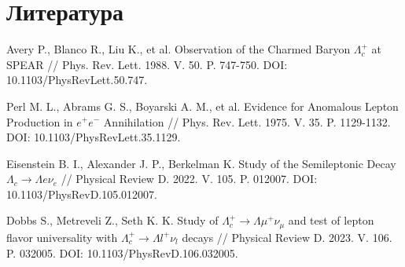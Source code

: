 \section{Литература}

\begin{thebibliography}{99}

    Avery P., Blanco R., Liu K., et al. Observation of the Charmed Baryon $\Lambda^+_c$ at SPEAR // Phys. Rev. Lett. 1988. V. 50. P. 747-750. DOI: 10.1103/PhysRevLett.50.747.
    
    Perl M. L., Abrams G. S., Boyarski A. M., et al. Evidence for Anomalous Lepton Production in $e^+e^-$ Annihilation // Phys. Rev. Lett. 1975. V. 35. P. 1129-1132. DOI: 10.1103/PhysRevLett.35.1129.
    
    Eisenstein B. I., Alexander J. P., Berkelman K. Study of the Semileptonic Decay $\Lambda_c \rightarrow \Lambda e \nu_e$ // Physical Review D. 2022. V. 105. P. 012007. DOI: 10.1103/PhysRevD.105.012007.
    
    Dobbs S., Metreveli Z., Seth K. K. Study of $\Lambda_c^+ \rightarrow \Lambda \mu^+ \nu_{\mu}$ and test of lepton flavor universality with $\Lambda_c^+ \rightarrow \Lambda l^+ \nu_l$ decays // Physical Review D. 2023. V. 106. P. 032005. DOI: 10.1103/PhysRevD.106.032005.
    
\end{thebibliography}